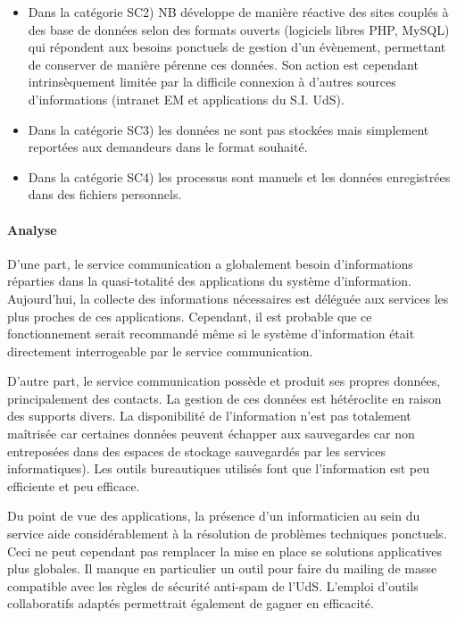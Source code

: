 \documentclass{book}
\begin{document}
\begin{itemize}
\item Dans la catégorie SC2) NB développe de manière réactive des sites couplés à 
	des base de données selon des formats ouverts (logiciels libres PHP, MySQL) 
	qui répondent aux besoins ponctuels de gestion d'un évènement, permettant
	de conserver de manière pérenne ces données. Son action est cependant intrinsèquement
	limitée par la difficile connexion à d'autres sources d'informations (intranet 
	EM et applications du S.I. UdS).

\item Dans la catégorie SC3) les données ne sont pas stockées mais simplement reportées
	aux demandeurs dans le format souhaité.

\item Dans la catégorie SC4) les processus sont manuels et les données enregistrées
	dans des fichiers personnels.
\end{itemize}

\paragraph{Analyse}

D'une part, le service communication a globalement besoin d'informations 
réparties dans la quasi-totalité des applications du système d'information.
Aujourd'hui, la collecte des informations nécessaires est déléguée aux
services les plus proches de ces applications. Cependant, il est probable 
que ce fonctionnement serait recommandé même si le système d'information
était directement interrogeable par le service communication.

D'autre part, le service communication possède et produit ses propres
données, principalement des contacts. La gestion de ces données
est hétéroclite en raison des supports divers. La disponibilité de
l'information n'est pas totalement maîtrisée car certaines données peuvent
échapper aux sauvegardes car non entreposées dans des espaces de stockage
sauvegardés par les services informatiques). Les outils bureautiques utilisés
font que l'information est peu efficiente et peu efficace. 


Du point de vue des applications, la présence d'un informaticien au
sein du service aide considérablement à la résolution de problèmes
techniques ponctuels. Ceci ne peut cependant pas remplacer la mise
en place se solutions applicatives plus globales. Il manque en particulier
un outil pour faire du mailing de masse compatible avec les règles de
sécurité anti-spam de l'UdS. L'emploi d'outils collaboratifs adaptés 
permettrait également de gagner en efficacité. 
\end{document}
